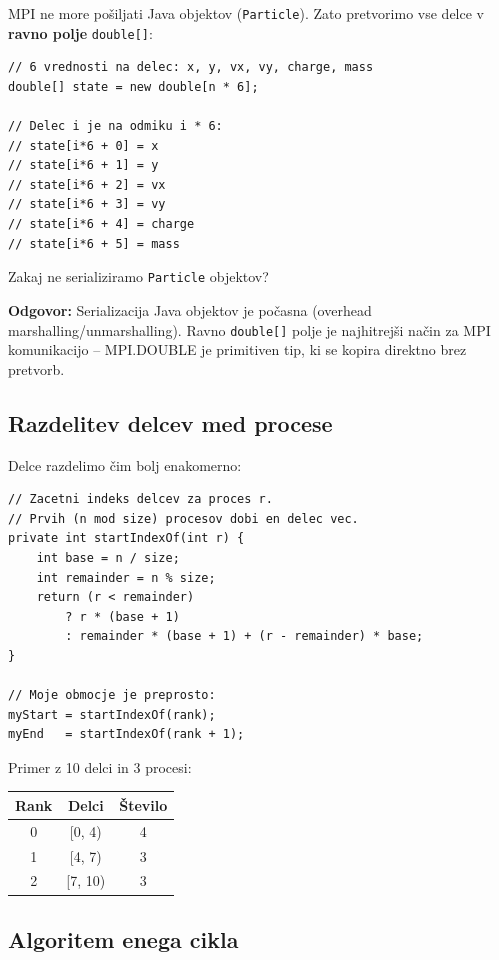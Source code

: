 \documentclass[12pt,a4paper]{article}
\begin{document}
MPI ne more po\v{s}iljati Java objektov (\texttt{Particle}). Zato pretvorimo vse delce v \textbf{ravno polje} \texttt{double[]}:

\begin{lstlisting}
// 6 vrednosti na delec: x, y, vx, vy, charge, mass
double[] state = new double[n * 6];

// Delec i je na odmiku i * 6:
// state[i*6 + 0] = x
// state[i*6 + 1] = y
// state[i*6 + 2] = vx
// state[i*6 + 3] = vy
// state[i*6 + 4] = charge
// state[i*6 + 5] = mass
\end{lstlisting}

\begin{vprasanje}
Zakaj ne serializiramo \texttt{Particle} objektov?

\textbf{Odgovor:} Serializacija Java objektov je po\v{c}asna (overhead marshalling/unmarshalling). Ravno \texttt{double[]} polje je najhitrej\v{s}i na\v{c}in za MPI komunikacijo -- MPI.DOUBLE je primitiven tip, ki se kopira direktno brez pretvorb.
\end{vprasanje}

\subsection{Razdelitev delcev med procese}

Delce razdelimo \v{c}im bolj enakomerno:
\begin{lstlisting}
// Zacetni indeks delcev za proces r.
// Prvih (n mod size) procesov dobi en delec vec.
private int startIndexOf(int r) {
    int base = n / size;
    int remainder = n % size;
    return (r < remainder)
        ? r * (base + 1)
        : remainder * (base + 1) + (r - remainder) * base;
}

// Moje obmocje je preprosto:
myStart = startIndexOf(rank);
myEnd   = startIndexOf(rank + 1);
\end{lstlisting}

Primer z 10 delci in 3 procesi:
\begin{center}
\begin{tabular}{|c|c|c|}
\hline
\textbf{Rank} & \textbf{Delci} & \textbf{\v{S}tevilo} \\
\hline
0 & [0, 4) & 4 \\
1 & [4, 7) & 3 \\
2 & [7, 10) & 3 \\
\hline
\end{tabular}
\end{center}

\subsection{Algoritem enega cikla}
\end{document}
